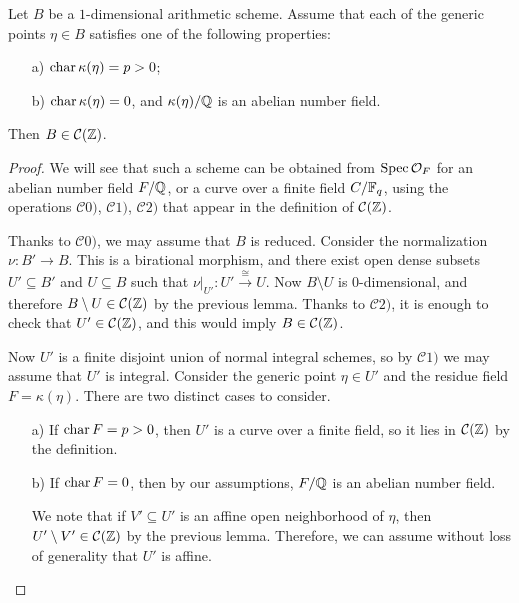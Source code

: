 \documentclass{article}
\numberwithin{equation}{section}
\begin{document}
\begin{proposition}
  \label{prop:particular-cases-1-dim-base}
  Let $B$ be a $1$-dimensional arithmetic scheme. Assume that each of the
  generic points $\eta \in B$ satisfies one of the following properties:
  \begin{enumerate}
  \item[a)] $\operatorname{char} \kappa (\eta) = p > 0$;

  \item[b)] $\operatorname{char} \kappa (\eta) = 0$, and $\kappa (\eta)/\mathbb{Q}$ is an abelian
    number field.
  \end{enumerate}
  Then $B \in \mathcal{C} (\mathbb{Z})$.

  \begin{proof}
    We will see that such a scheme can be obtained from $\operatorname{Spec} \mathcal{O}_F$
    for an abelian number field $F/\mathbb{Q}$, or a curve over a finite field
    $C/\mathbb{F}_q$, using the operations $\mathcal{C}0)$, $\mathcal{C}1)$,
    $\mathcal{C}2)$ that appear in the definition of $\mathcal{C} (\mathbb{Z})$.

    Thanks to $\mathcal{C}0)$, we may assume that $B$ is reduced. Consider the
    normalization $\nu\colon B' \to B$. This is a birational morphism, and there
    exist open dense subsets $U' \subseteq B'$ and $U \subseteq B$ such that
    $\left.\nu\right|_{U'}\colon U' \xrightarrow{\cong} U$. Now $B\setminus U$
    is $0$-dimensional, and therefore $B\setminus U \in \mathcal{C} (\mathbb{Z})$ by
    the previous lemma. Thanks to $\mathcal{C}2)$, it is enough to check that
    $U' \in \mathcal{C} (\mathbb{Z})$, and this would imply $B \in \mathcal{C} (\mathbb{Z})$.

    Now $U'$ is a finite disjoint union of normal integral schemes, so by
    $\mathcal{C}1)$ we may assume that $U'$ is integral. Consider the generic
    point $\eta \in U'$ and the residue field $F = \kappa (\eta)$. There are two
    distinct cases to consider.

    \begin{enumerate}
    \item[a)] If $\operatorname{char} F = p > 0$, then $U'$ is a curve over a finite field,
      so it lies in $\mathcal{C} (\mathbb{Z})$ by the definition.

    \item[b)] If $\operatorname{char} F = 0$, then by our assumptions, $F/\mathbb{Q}$ is an abelian
      number field.

      We note that if $V' \subseteq U'$ is an affine open neighborhood of
      $\eta$, then $U'\setminus V' \in \mathcal{C} (\mathbb{Z})$ by the previous
      lemma. Therefore, we can assume without loss of generality that $U'$ is
      affine.


\end{enumerate}
\end{proof}
\end{proposition}
\end{document}
